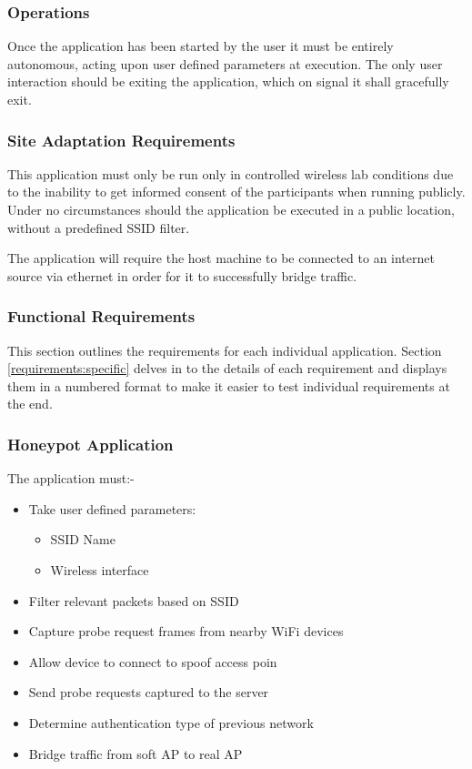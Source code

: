 \subsubsection{Operations}
Once the application has been started by the user it must be entirely autonomous, acting upon user defined parameters at execution. The only user interaction should be exiting the application, which on signal it shall gracefully exit.

\subsubsection{Site Adaptation Requirements}
This application must only be run only in controlled wireless lab conditions due to the inability to get informed consent of the participants when running publicly. Under no circumstances should the application be executed in a public location, without a predefined SSID filter.

The application will require the host machine to be connected to an internet source via ethernet in order for it to successfully bridge traffic.

\newpage
\subsubsection{Functional Requirements}
This section outlines the requirements for each individual application. Section \ref{requirements:specific} delves in to the details of each requirement and displays them in a numbered format to make it easier to test individual requirements at the end.

\subsubsection*{Honeypot Application}
The application must:-
\begin{itemize}
	\item Take user defined parameters:
		\begin{itemize}
			\item SSID Name
			\item Wireless interface
		\end{itemize}
	\item Filter relevant packets based on SSID
	\item Capture probe request frames from nearby WiFi devices
	\item Allow device to connect to spoof access poin
	\item Send probe requests captured to the server
	\item Determine authentication type of previous network
	\item Bridge traffic from soft AP to real AP
\end{itemize}


